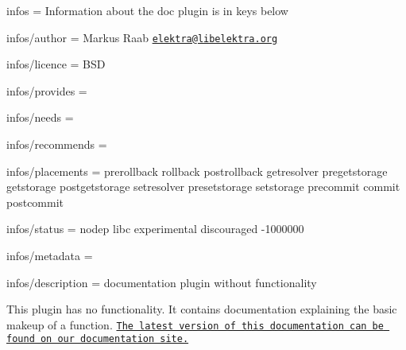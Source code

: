 
\begin{DoxyItemize}
\item infos = Information about the doc plugin is in keys below
\item infos/author = Markus Raab \href{mailto:elektra@libelektra.org}{\tt elektra@libelektra.\+org}
\item infos/licence = B\+SD
\item infos/provides =
\item infos/needs =
\item infos/recommends =
\item infos/placements = prerollback rollback postrollback getresolver pregetstorage getstorage postgetstorage setresolver presetstorage setstorage precommit commit postcommit
\item infos/status = nodep libc experimental discouraged -\/1000000
\item infos/metadata =
\item infos/description = documentation plugin without functionality
\end{DoxyItemize}

This plugin has no functionality. It contains documentation explaining the basic makeup of a function. \href{https://doc.libelektra.org/api/latest/html/group__plugin.html}{\tt The latest version of this documentation can be found on our documentation site.} 
